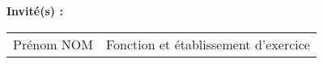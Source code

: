 {\vspace{\baselineskip}
{\normalTwelve \textbf{Invit\'{e}(s) :}}\\ \newline
\footnotesizeTwelve
\begin{tabular}{@{}ll}
Pr\'{e}nom NOM & Fonction et \'{e}tablissement d'exercice \\
\end{tabular}
}


\maketitle
